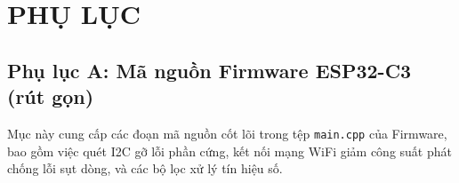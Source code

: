 \section*{PHỤ LỤC}
\thispagestyle{empty}

\subsection*{Phụ lục A: Mã nguồn Firmware ESP32-C3 (rút gọn)}
Mục này cung cấp các đoạn mã nguồn cốt lõi trong tệp \texttt{main.cpp} của Firmware, bao gồm việc quét I2C gỡ lỗi phần cứng, kết nối mạng WiFi giảm công suất phát chống lỗi sụt dòng, và các bộ lọc xử lý tín hiệu số.

